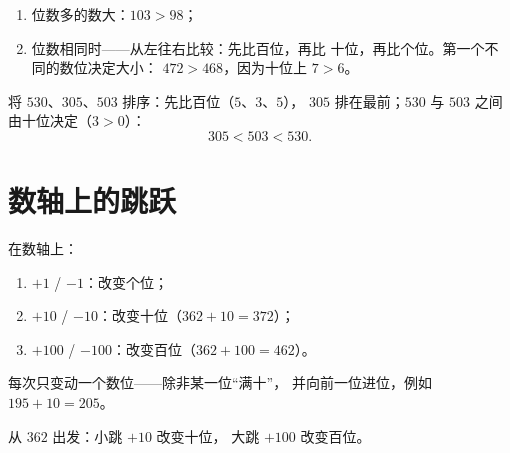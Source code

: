 \begin{method}[比较三位数]\label{met:g2:numbers:compare}
\begin{enumerate}
  \item 位数多的数大：$103 > 98$；
  \item 位数相同时——从左往右比较：先比百位，再比
        十位，再比个位。第一个不同的数位决定大小：
        $472 > 468$，因为十位上 $7 > 6$。
\end{enumerate}
\end{method}

\begin{example}\label{ex:g2:numbers:order}
将 $530$、$305$、$503$ 排序：先比百位（$5$、$3$、$5$），
$305$ 排在最前；$530$ 与 $503$ 之间由十位决定（$3 > 0$）：
\[
305 < 503 < 530 .
\]
\end{example}

\section{数轴上的跳跃}

\begin{method}[加整十数与整百数]\label{met:g2:numbers:jumps}
在数轴上：
\begin{enumerate}
  \item $+1$ / $-1$：改变个位；
  \item $+10$ / $-10$：改变十位（$362 + 10 = 372$）；
  \item $+100$ / $-100$：改变百位（$362 + 100 = 462$）。
\end{enumerate}
每次只变动一个数位——除非某一位“满十”，
并向前一位进位，例如 $195 + 10 = 205$。
\end{method}

\begin{omfigure}

{\small 从 $362$ 出发：小跳 $+10$ 改变十位，
大跳 $+100$ 改变百位。}
\end{omfigure}


